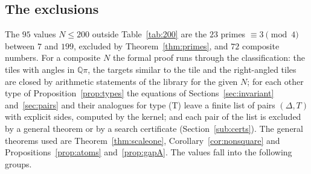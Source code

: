 \documentclass[11pt,reqno]{amsart}
\theoremstyle{plain}
\theoremstyle{definition}
\newcommand{\Q}{\mathbb{Q}}
\begin{document}
\subsection{The exclusions}\label{sub:excl}
The $95$ values $N\le200$ outside Table~\ref{tab:200} are the $23$ primes $\equiv3\pmod4$
between $7$ and $199$, excluded by Theorem~\ref{thm:primes}, and $72$ composite numbers. For a composite $N$
the formal proof runs through the classification: the tiles with angles in $\Q\pi$, the targets similar to
the tile and the right-angled tiles are closed by arithmetic statements of the library for the given $N$;
for each other type of Proposition~\ref{prop:types} the equations of
Sections~\ref{sec:invariant} and~\ref{sec:pairs} and their analogues for type (T) leave a finite list of
pairs $(\Delta,T)$ with explicit sides, computed by the kernel; and each pair of the list is excluded by a
general theorem or by a search certificate (Section~\ref{sub:certs}). The general theorems used are
Theorem~\ref{thm:scaleone}, Corollary~\ref{cor:nonsquare} and Propositions~\ref{prop:atoms}
and~\ref{prop:gapA}. The values fall into the following groups.
\end{document}
